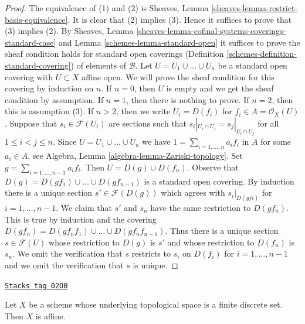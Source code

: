 \begin{proof}

The equivalence of (1) and (2) is
Sheaves, Lemma \ref{sheaves-lemma-restrict-basis-equivalence}.
It is clear that (2) implies (3).
Hence it suffices to prove that (3) implies (2). By
Sheaves, Lemma \ref{sheaves-lemma-cofinal-systems-coverings-standard-case}
and Lemma \ref{schemes-lemma-standard-open} it suffices to prove the sheaf
condition holds for standard open coverings
(Definition \ref{schemes-definition-standard-covering})
of elements of $\mathcal{B}$.
Let $U = U_1 \cup \ldots \cup U_n$ be a standard open covering
with $U \subset X$ affine open.
We will prove the sheaf condition
for this covering by induction on $n$.
If $n = 0$, then $U$ is empty and we get the sheaf condition
by assumption. If $n = 1$, then there is nothing to prove.
If $n = 2$, then this is assumption (3).
If $n > 2$, then we write $U_i = D(f_i)$ for $f_i \in A = \mathcal{O}_X(U)$.
Suppose that $s_i \in \mathcal{F}(U_i)$ are sections such that
$s_i|_{U_i \cap U_j} = s_j|_{U_i \cap U_j}$ for all $1 \leq i < j \leq n$.
Since $U = U_1 \cup \ldots \cup U_n$ we have
$1 = \sum_{i = 1, \ldots, n} a_i f_i$ in $A$ for some $a_i \in A$, see
Algebra, Lemma \ref{algebra-lemma-Zariski-topology}.
Set $g = \sum_{i = 1, \ldots, n - 1} a_if_i$.
Then $U = D(g) \cup D(f_n)$.
Observe that $D(g) = D(gf_1) \cup \ldots \cup D(gf_{n - 1})$
is a standard open covering. By induction there is a unique section
$s' \in \mathcal{F}(D(g))$ which agrees with
$s_i|_{D(gfi)}$ for $i = 1, \ldots, n - 1$.
We claim that $s'$ and $s_n$ have the same restriction to
$D(gf_n)$. This is true by induction and the covering
$D(gf_n) = D(gf_nf_1) \cup \ldots \cup D(gf_nf_{n - 1})$.
Thus there is a unique section $s \in \mathcal{F}(U)$
whose restriction to $D(g)$ is $s'$ and whose restriction
to $D(f_n)$ is $s_n$. We omit the verification that $s$
restricts to $s_i$ on $D(f_i)$ for $i = 1, \ldots, n - 1$
and we omit the verification that $s$ is unique.
\end{proof}

\begin{lemma}
\label{schemes-lemma-scheme-finite-discrete-affine}
\href{https://stacks.math.columbia.edu/tag/02O0}{\texttt{Stacks tag 02O0}}

Let $X$ be a scheme whose underlying topological space
is a finite discrete set.
Then $X$ is affine.
\end{lemma}

